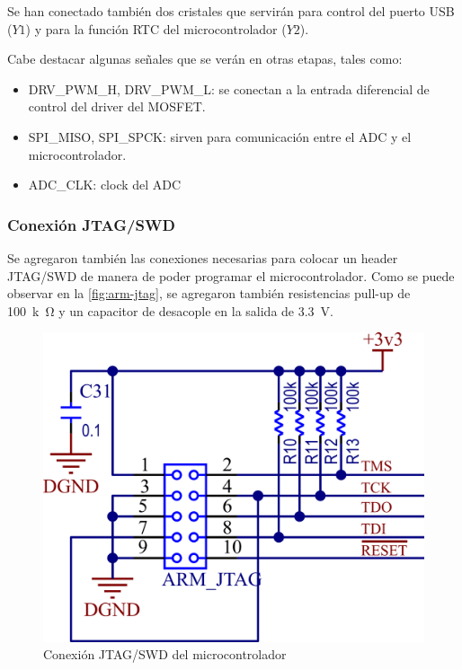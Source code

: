 \documentclass[../et.tex]{subfiles}
\begin{document}
Se han conectado también dos cristales que servirán para control del puerto USB ($Y1$) y para la función RTC del microcontrolador ($Y2$).

Cabe destacar algunas señales que se verán en otras etapas, tales como:

\begin{itemize}
  \item DRV\_PWM\_H, DRV\_PWM\_L: se conectan a la entrada diferencial de control del driver del MOSFET.
  \item SPI\_MISO, SPI\_SPCK: sirven para comunicación entre el ADC y el microcontrolador.
  \item ADC\_CLK: clock del ADC
\end{itemize}

\subsubsection{Conexión JTAG/SWD}
Se agregaron también las conexiones necesarias para colocar un header JTAG/SWD de manera de poder programar el microcontrolador. Como se puede observar en la \autoref{fig:arm-jtag}, se agregaron también resistencias pull-up de \SI{100}{k\ohm} y un capacitor de desacople en la salida de \SI{3.3}{V}.

\begin{figure}[!htbp]
  \centering
  \includegraphics[scale=1.5]{../images/arm-jtag.png}
  \caption{Conexión JTAG/SWD del microcontrolador}
  \label{fig:arm-jtag}
\end{figure}
\end{document}
